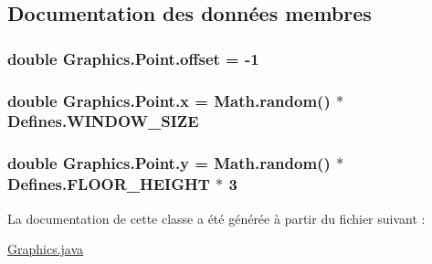 \subsection{Documentation des données membres}
\hypertarget{classGraphics_1_1Point_a3612c34a8c05c76590073d9274db95b1}{
\subsubsection[{offset}]{\setlength{\rightskip}{0pt plus 5cm}double Graphics.\-Point.\-offset = -\/1\hspace{0.3cm}{\ttfamily [package]}}}\label{classGraphics_1_1Point_a3612c34a8c05c76590073d9274db95b1}
\hypertarget{classGraphics_1_1Point_a58d7632eb589af219c6c4bf7c2178bd3}{
\subsubsection[{x}]{\setlength{\rightskip}{0pt plus 5cm}double Graphics.\-Point.\-x = Math.\-random() $\ast$ {\bf Defines.\-W\-I\-N\-D\-O\-W\-\_\-\-S\-I\-Z\-E}\hspace{0.3cm}{\ttfamily [package]}}}\label{classGraphics_1_1Point_a58d7632eb589af219c6c4bf7c2178bd3}
\hypertarget{classGraphics_1_1Point_abadff6ba5989616e892517ebb421440a}{
\subsubsection[{y}]{\setlength{\rightskip}{0pt plus 5cm}double Graphics.\-Point.\-y = Math.\-random() $\ast$ {\bf Defines.\-F\-L\-O\-O\-R\-\_\-\-H\-E\-I\-G\-H\-T} $\ast$ 3\hspace{0.3cm}{\ttfamily [package]}}}\label{classGraphics_1_1Point_abadff6ba5989616e892517ebb421440a}


La documentation de cette classe a été générée à partir du fichier suivant \-:\begin{DoxyCompactItemize}
\item 
\hyperlink{Graphics_8java}{Graphics.\-java}\end{DoxyCompactItemize}
